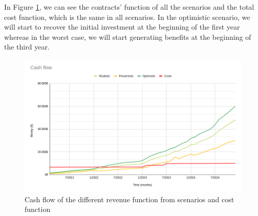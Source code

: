 \documentclass[./main.tex]{subfiles}
\begin{document}
In Figure \ref{fig:cashflow}, we can see the contracts’ function of all the scenarios and the total cost function, which is the same in all scenarios. In the optimistic scenario, we will start to recover the initial investment at the beginning of the first year whereas in the worst case, we will start generating benefits at the beginning of the third year.
\begin{figure}[h]
	\centering
	\includegraphics[width=15cm]{CashFlow.png}
	\caption{Cash flow of the different revenue function from scenarios and cost function}
	\label{fig:cashflow}
\end{figure}
\end{document}
